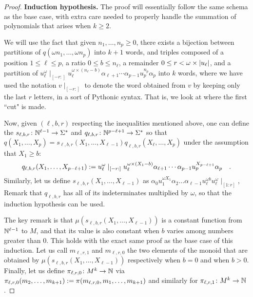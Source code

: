 \begin{proof}
    \textbf{Induction hypothesis.}
    The proof will essentially follow the same schema as the base case,
    with extra care needed to properly handle the summation of polynomials
    that arises when $k \geq 2$.

    We will use the fact that given $n_1, \dots, n_p \geq 0$,
    there exists a bijection between
    partitions of $q(\omega n_1, \dots, \omega n_p)$
    into $k+1$ words, and 
    triples composed of
    a position  $1 \leq \ell \leq p$,
    a ratio     $0 \leq b \leq n_\ell$,
    a remainder $0 \leq r < \omega \times \card{u_\ell}$,
    and a partition of
    $u_\ell^\omega\mid_{[-r:]} u_\ell^{\omega \times (n_\ell - b)}
    \alpha_{\ell+1} \cdots \alpha_{p-1} u_p^{n_p} \alpha_{p}$
    into $k$ words,
    where we have used the notation 
    $v\mid_{[-r:]}$ to denote the word obtained from $v$ 
    by keeping only the last $r$ letters, in a sort of Pythonic syntax.
    That is, we look at where the first ``cut" is made.

    Now, given $(\ell, b, r)$ respecting the inequalities 
    mentioned above,
    one can define the 
    $s_{\ell,b,r} \colon \mathbb{N}^{\ell - 1} \to \Sigma^*$
    and
    $q_{\ell,b,r} \colon \mathbb{N}^{p - \ell + 1} \to \Sigma^*$
    so that
    $q(X_1, \dots, X_p) = s_{\ell, b, r}(X_1, \dots, X_{\ell-1}) 
    q_{\ell, b, r}(X_{\ell}, \dots, X_p)$
    under the assumption that $X_1 \geq b$:
    \begin{equation*}
        q_{\ell,b,r}(X_{1}, \dots, X_{p - \ell + 1})
        \mathrel{:=}
        u_\ell^\omega\mid_{[-r:]} u_\ell^{\omega \times (X_1 - b)}
        \alpha_{\ell+1} \cdots \alpha_{p-1} u_p^{X_{p - \ell + 1}} \alpha_{p}
        \quad .
    \end{equation*}
    Similarly, let us define 
    $s_{\ell, b, r}(X_1, \dots, X_{\ell - 1})$
    as 
    $\alpha_0 u_1^{\omega X_1} \alpha_2 \dots \alpha_{\ell - 1} 
    u_\ell^{\omega b} u_{\ell}^\omega \mid_{[1:r]}$,
    Remark that $q_{\ell,b,r}$ has all of its indeterminates
    multiplied by $\omega$, so that the induction hypothesis 
    can be used.

    The key remark is that $\mu(s_{\ell,b,r}(X_1, \dots, X_{\ell - 1}))$ is a
    constant function from $\mathbb{N}^{\ell-1}$ to $M$, and that its value is also
    constant when $b$ varies among numbers greater than $0$. This holds with
    the exact same proof as the base case of this induction. Let us call
    $m_{\ell,r,1}$ and $m_{\ell,r,0}$ the two elements of the monoid that are
    obtained by $\mu(s_{\ell,b,r}(X_1, \dots, X_{\ell-1}))$ respectively when
    $b = 0$ and when $b > 0$. Finally, let us define $\pi_{\ell,r,0} \colon M^k
    \to \mathbb{N}$ via $\pi_{\ell,r,0}(m_2, \dots, m_{k+1}) \mathrel{:=}
    \pi(m_{\ell,r,0}, m_1, \dots, m_{k+1})$ and similarly for $\pi_{\ell,r,1}
    \colon M^k \to \mathbb{N}$.


\end{proof}

